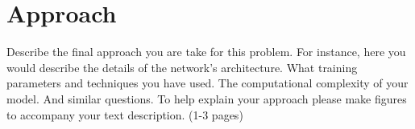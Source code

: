 
\section{Approach}

Describe the final approach you are take for this problem.
For instance, here you would describe the details of the network’s
architecture. What training parameters and techniques you have used.
The computational complexity of your model. And similar questions.
To help explain your approach please make figures to accompany your
text description. (1-3 pages)